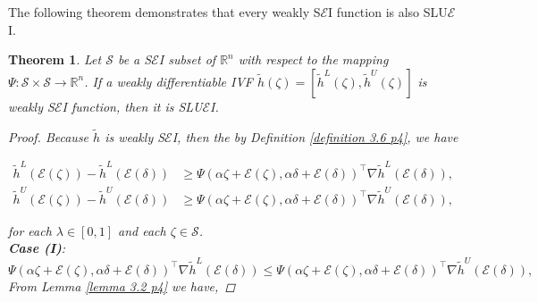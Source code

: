 \documentclass[12pt, reqno]{amsart}
\newtheorem{theorem}{Theorem}[section]
\theoremstyle{definition}
\theoremstyle{remark}
\numberwithin{equation}{section}
\begin{document}
The following theorem demonstrates that every weakly S$\mathcal{\mathcal{E}}$I function is also SLU$\mathcal{\mathcal{E}}$I.
\begin{theorem} \label{theorem 3.9 p4}
Let $\mathcal{S}$ be a S$\mathcal{\mathcal{E}}$I subset of $\mathbb{R}^n$  with respect to the mapping $\Psi : \mathcal{S} \times \mathcal{S} \rightarrow \mathbb{R}^n$. If a weakly differentiable IVF $\tilde{h}(\mathit{\zeta} ) = [\tilde{h}^L(\mathit{\zeta} ), \tilde{h}^U(\mathit{\zeta} )]$ is weakly S$\mathcal{\mathcal{E}}$I function, then it is SLU$\mathcal{\mathcal{E}}$I.
\begin{proof}
   Because $\tilde{h} $ is weakly S$\mathcal{\mathcal{E}}$I, then the by Definition \ref{definition 3.6 p4}, we have

\begin{align}
\label{eq 3.3 p2}\tilde{h}^L(\mathcal{\mathcal{E}}(\mathit{\zeta} )) - \tilde{h}^L(\mathcal{\mathcal{E}}(\mathit{\delta} )) &\geq \Psi(\alpha \mathit{\zeta} +\mathcal{\mathcal{E}}(\mathit{\zeta} ),\alpha \mathit{\delta} +\mathcal{\mathcal{E}}(\mathit{\delta} ))^{\!\top} \nabla \tilde{h}^L(\mathcal{\mathcal{E}}(\mathit{\delta} )), \\
\label{eq 3.4 p2}\tilde{h}^U(\mathcal{\mathcal{E}}(\mathit{\zeta} )) - \tilde{h}^U(\mathcal{\mathcal{E}}(\mathit{\delta} )) &\geq \Psi(\alpha \mathit{\zeta} +\mathcal{\mathcal{E}}(\mathit{\zeta} ),\alpha \mathit{\delta} +\mathcal{\mathcal{E}}(\mathit{\delta} ))^{\!\top} \nabla \tilde{h}^U(\mathcal{\mathcal{E}}(\mathit{\delta} )),
\end{align}

for each $\lambda \in [0,1]$ and each $\mathit{\zeta}  \in \mathcal{S}$.\\
\textbf{Case (I)}:
\begin{equation*}
    \Psi(\alpha \mathit{\zeta} +\mathcal{\mathcal{E}}(\mathit{\zeta} ),\alpha \mathit{\delta} +\mathcal{\mathcal{E}}(\mathit{\delta} ))^{\!\top} \nabla \tilde{h}^L(\mathcal{\mathcal{E}}(\mathit{\delta} )) \leq \Psi(\alpha \mathit{\zeta} +\mathcal{\mathcal{E}}(\mathit{\zeta} ),\alpha \mathit{\delta} +\mathcal{\mathcal{E}}(\mathit{\delta} ))^{\!\top} \nabla \tilde{h}^U(\mathcal{\mathcal{E}}(\mathit{\delta} )),
\end{equation*} 
From Lemma \ref{lemma 3.2 p4} we have,


\end{proof}
\end{theorem}
\end{document}
